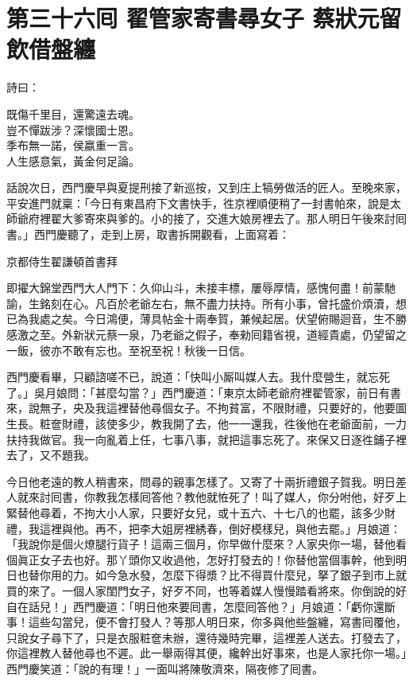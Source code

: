
\chapter*{第三十六囘 翟管家寄書尋女子 蔡狀元留飲借盤纏}


詩曰：

\begin{myquote} 
既傷千里目，還驚遠去魂。\\豈不憚跋涉？深懷國士恩。\\季布無一諾，侯嬴重一言。\\人生感意氣，黃金何足論。
\end{myquote} 

話說次日，西門慶早與夏提刑接了新巡按，又到庄上犒勞做活的匠人。至晚來家，平安進門就稟：「今日有東昌府下文書快手，徃京裡順便稍了一封書帕來，說是太師爺府裡翟大爹寄來與爹的。小的接了，交進大娘房裡去了。那人明日午後來討囘書。」西門慶聽了，走到上房，取書拆開觀看，上面寫着：

\begin{myquote}[\markfont]
京都侍生翟謙頓首書拜

即擢大錦堂西門大人門下：久仰山斗，未接丰標，屢辱厚情，感愧何盡！前蒙馳諭，生銘刻在心。凡百於老爺左右，無不盡力扶持。所有小事，曾托盛价煩瀆，想已為我處之矣。今日鴻便，薄具帖金十兩奉賀，兼候起居。伏望俯賜迴音，生不勝感激之至。外新狀元蔡一泉，乃老爺之假子，奉勑囘籍省視，道經貴處，仍望留之一飯，彼亦不敢有忘也。至祝至祝！秋後一日信。
\end{myquote} 

西門慶看畢，只顧諮嗟不已，說道：「快叫小厮叫媒人去。我什麼營生，就忘死了。」{}吳月娘問：「甚麼勾當？」西門慶道：「東京太師老爺府裡翟管家，前日有書來，說無子，央及我這裡替他尋個女子。不拘貧富，不限財禮，只要好的，他要圖生長。粧奩財禮，該使多少，教我開了去，他一一還我，徃後他在老爺面前，一力扶持我做官。我一向亂着上任，七事八事，就把這事忘死了。來保又日逐徃鋪子裡去了，又不題我。

今日他老遠的教人稍書來，問尋的親事怎樣了。又寄了十兩折禮銀子賀我。明日差人就來討囘書，你教我怎樣囘答他？教他就恠死了！叫了媒人，你分咐他，好歹上緊替他尋着，不拘大小人家，只要好女兒，或十五六、十七八的也罷，該多少財禮，我這裡與他。再不，把李大姐房裡綉春，倒好模樣兒，與他去罷。」月娘道：「我說你是個火燎腿行貨子！這兩三個月，你早做什麼來？人家央你一場，替他看個眞正女子去也好。那丫頭你又收過他，怎好打發去的！你替他當個事幹，他到明日也替你用的力。如今急水發，怎麼下得漿？比不得買什麼兒，拏了銀子到市上就買的來了。一個人家閨門女子，好歹不同，也等着媒人慢慢踏看將來。你倒說的好自在話兒！」西門慶道：「明日他來要囘書，怎麼囘答他？」月娘道：「虧你還斷事！這些勾當兒，便不會打發人？等那人明日來，你多與他些盤纏，寫書囘覆他，只說女子尋下了，只是衣服粧奩未辦，還待幾時完畢，這裡差人送去。打發去了，你這裡教人替他尋也不遲。此一舉兩得其便，纔幹出好事來，也是人家托你一場。」西門慶笑道：「說的有理！」一面叫將陳敬濟來，隔夜修了囘書。

